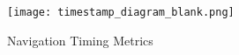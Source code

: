 











\begin{figure}[h!]
\begin{center}
\texttt{[image: timestamp\_diagram\_blank.png]}
\caption{Navigation Timing Metrics}
\label{img:latency}
\end{center}
\end{figure}








